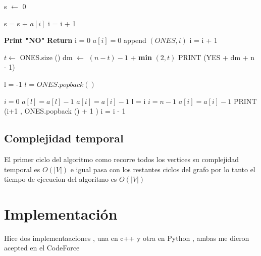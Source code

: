 \documentclass[10pt]{article}
\begin{document}
        \begin{algorithmic}[1]      
        \State s $ \leftarrow$ 0 
        
                \State s = s + $a\left[i\right]$
                \State i = i + 1 
        \EndWhile 

            \State \textbf{Print "NO"}
            \State \textbf{Return}
        \EndIf
        \State i = 0 
                \State $a\left[i\right] = 0$
                \State append $\left(ONES , i  \right)$
                \State i = i + 1 
            \EndIf 
        \EndWhile

        \State $t\leftarrow $ ONES.size ()
        \State dm $\leftarrow$ $\left(n-t\right) - 1$ + \textbf{min} $\left(2,t\right)$
        \State PRINT (YES +  dm + n - 1) 

        \State l = -1 
            \State $l$ = $ONES.popback()$
        \EndIf
        
        \State $i = 0$
                    \State $a\left[l\right] = a\left[l\right]  -1  $
                    \State $a\left[i\right] = a\left[i\right]  -1  $
                \EndIf
                \State l = i 
            \EndIf
        \EndWhile
        \State $i = n-1$
                \State $a\left[i\right] = a\left[i\right] - 1 $
                \State PRINT (i+1 , ONES.popback () + 1 )
            \EndWhile
            \State i = i - 1 
        \EndWhile
        \end{algorithmic}
    

    \subsection{Complejidad temporal} 
    
    \noindent El primer ciclo del algoritmo como recorre todos los vertices su complejidad temporal es $O \left(\vert V \vert \right)$ e igual pasa con los restantes ciclos del grafo por lo tanto el tiempo de ejecucion del algoritmo es $O \left(\vert V \vert \right)$


    \section{Implementaci\'on }
    \noindent Hice  dos implementaaciones , una en c++ y otra en Python , ambas me dieron acepted en el CodeForce 
\end{document}

